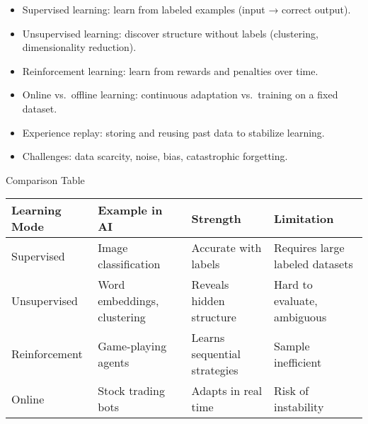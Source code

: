 \documentclass[
  letterpaper,
  DIV=11,
  numbers=noendperiod]{scrreprt}
\providecommand{\tightlist}{%
  \setlength{\itemsep}{0pt}\setlength{\parskip}{0pt}}
\begin{document}
\begin{itemize}
\tightlist
\item
  Supervised learning: learn from labeled examples (input → correct
  output).
\item
  Unsupervised learning: discover structure without labels (clustering,
  dimensionality reduction).
\item
  Reinforcement learning: learn from rewards and penalties over time.
\item
  Online vs.~offline learning: continuous adaptation vs.~training on a
  fixed dataset.
\item
  Experience replay: storing and reusing past data to stabilize
  learning.
\item
  Challenges: data scarcity, noise, bias, catastrophic forgetting.
\end{itemize}

Comparison Table

\begin{longtable}[]{@{}
  >{\raggedright\arraybackslash}p{}
  >{\raggedright\arraybackslash}p{}
  >{\raggedright\arraybackslash}p{}
  >{\raggedright\arraybackslash}p{}@{}}
\toprule\noalign{}
\begin{minipage}[b]{\linewidth}\raggedright
Learning Mode
\end{minipage} & \begin{minipage}[b]{\linewidth}\raggedright
Example in AI
\end{minipage} & \begin{minipage}[b]{\linewidth}\raggedright
Strength
\end{minipage} & \begin{minipage}[b]{\linewidth}\raggedright
Limitation
\end{minipage} \\
\midrule\noalign{}
\endhead
\bottomrule\noalign{}
\endlastfoot
Supervised & Image classification & Accurate with labels & Requires
large labeled datasets \\
Unsupervised & Word embeddings, clustering & Reveals hidden structure &
Hard to evaluate, ambiguous \\
Reinforcement & Game-playing agents & Learns sequential strategies &
Sample inefficient \\
Online & Stock trading bots & Adapts in real time & Risk of
instability \\
\end{longtable}
\end{document}
